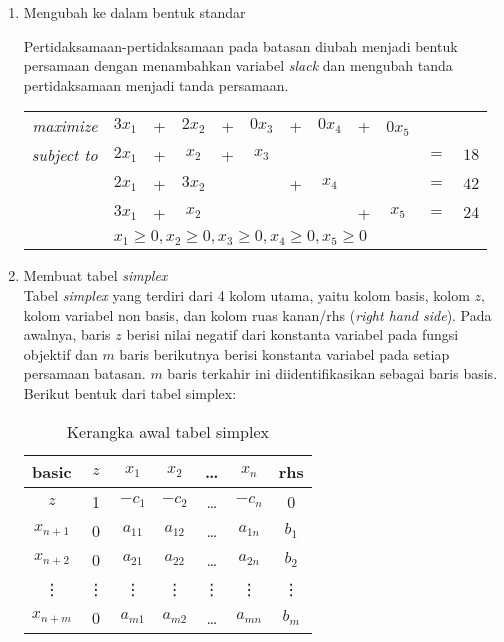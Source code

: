 \begin{enumerate}
	\item Mengubah ke dalam bentuk standar
	
        Pertidaksamaan-pertidaksamaan pada batasan diubah menjadi bentuk persamaan dengan menambahkan variabel \textit{slack} dan mengubah tanda pertidaksamaan menjadi tanda persamaan.
        
	    \begin{center}
			\begin{tabular}{r c @{}c @{}c @{}c @{}c @{}c @{}c @{}c @{}c c l}
    	    	\textit{maximize}   & $3x_1$ & + & $2x_2$ & + & $0x_3$ & + & $0x_4$ & + & 0$x_5$\\
	            \textit{subject to} & $2x_1$ & + & $x_2$  & + & $x_3$ &   &       &   &       & $=$ & $18$ \\
                        	   		& $2x_1$ & + & $3x_2$ &   &       & + & $x_4$ &   &       & $=$ & $42$ \\
                    	       		& $3x_1$ & + & $x_2$  &   &       &   &       & + & $x_5$ & $=$ & $24$ \\
                	           		& \multicolumn{11}{l}{$x_1\geq0,x_2\geq0,x_3\geq0,x_4\geq0,x_5\geq0$} \\
        	\end{tabular}
		\end{center}
			
	\item Membuat tabel \textit{simplex}\\
		Tabel \textit{simplex} yang terdiri dari 4 kolom utama, yaitu kolom basis, kolom $z$, kolom variabel non basis, dan kolom ruas kanan/rhs (\textit{right hand side}). Pada awalnya, baris $z$ berisi nilai negatif dari konstanta variabel pada fungsi objektif dan $m$ baris berikutnya berisi konstanta variabel pada setiap persamaan batasan. $m$ baris terkahir ini diidentifikasikan sebagai baris basis. Berikut bentuk dari tabel simplex:
        	
		\begin{table}[H]
			\centering
			\begin{tabular}{|c|c|c c c c |c|}
				\hline
				basic & $z$ & $x_1$ & $x_2$ & \dots & $x_n$ & rhs \\
				\hline
				$z$ & 1 & $-c_1$ & $-c_2$ & \dots & $-c_n$ & 0 \\
				\hline
				$x_{n+1}$ & 0 & $a_{11}$ & $a_{12}$ & \dots & $a_{1n}$ & $b_1$ \\
				$x_{n+2}$ & 0 & $a_{21}$ & $a_{22}$ & \dots & $a_{2n}$ & $b_2$ \\
				\vdots & \vdots & \vdots & \vdots & \vdots & \vdots & \vdots \\
				$x_{n+m}$ & 0 & $a_{m1}$ & $a_{m2}$ & \dots & $a_{mn}$ & $b_m$ \\
				\hline
			\end{tabular}
			\caption{Kerangka awal tabel simplex}
		\end{table}
			

\end{enumerate}
